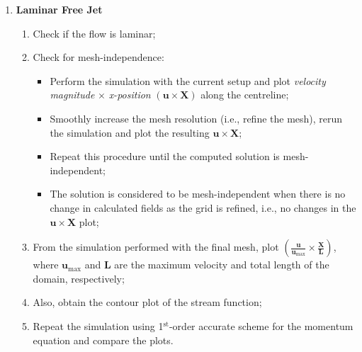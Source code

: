\documentclass[12pts,a4paper,amsmath,amssymb,floatfix]{article}%
\newcommand{\frc}{\displaystyle\frac}
\begin{document}
\begin{enumerate}[label=\bfseries Problem \arabic*:]
\begin{enumerate}[label=\bfseries Task \arabic*]

\item\label{Practical1:Task1} {\bf Laminar Free Jet}
  \begin{enumerate} 
     \item Check if the flow is laminar;
     \item\label{Task1:MeshIndependenceCriteria} Check for mesh-independence:
        \begin{itemize}
            \item Perform the simulation with the current setup and plot {\it velocity magnitude} $\times$ {\it x-position} $\left(\mathbf{u}\times\mathbf{X}\right)$ along the centreline;
            \item Smoothly increase the mesh resolution (i.e., refine the mesh), rerun the simulation and plot the resulting $\mathbf{u}\times\mathbf{X}$;
            \item Repeat this procedure until the computed solution is mesh-independent;
            \item The solution is considered to be mesh-independent when there is no change in calculated fields as the grid is refined, i.e., no changes in the $\mathbf{u}\times\mathbf{X}$ plot;
        \end{itemize}
     \item From the simulation performed with the final mesh, plot $\left(\frc{\mathbf{u}}{\mathbf{u}_{\text{max}}}\times \frc{\mathbf{X}}{\mathbf{L}}\right)$, where $\mathbf{u}_{\text{max}}$ and $\mathbf{L}$ are the maximum velocity and total length of the domain, respectively;
     \item\label{Task1:StreamFunction} Also, obtain the contour plot of the stream function;
     \item Repeat the simulation using 1$^{\text{st}}$-order accurate scheme for the momentum equation and compare the plots.
  \end{enumerate}


\end{enumerate}
\end{enumerate}
\end{document}
